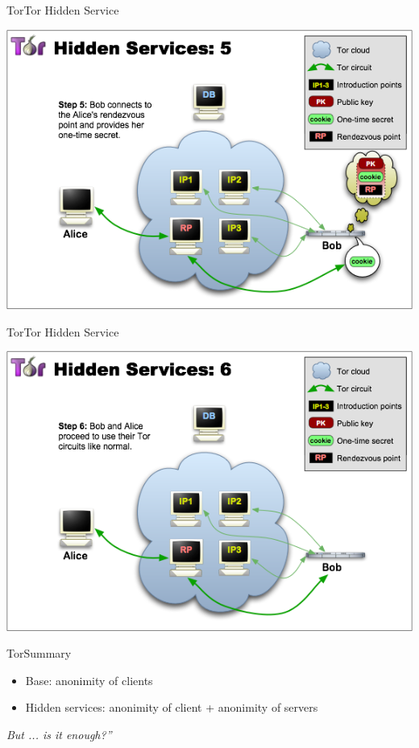 \begin{frame}{Tor}{Tor Hidden Service}
\begin{center}
	\includegraphics[scale=0.45]{imgs/THS-5.png}
\end{center}
\end{frame}

\begin{frame}{Tor}{Tor Hidden Service}
\begin{center}
	\includegraphics[scale=0.45]{imgs/THS-6.png}
\end{center}
\end{frame}

\begin{frame}{Tor}{Summary}
\begin{center}
	\begin{itemize}
		\item Base: anonimity of clients
		\item Hidden services: anonimity of client + anonimity of servers
	\end{itemize}
	
	\begin{center}
			\large{\emph{But ... is it enough?''}}
	\end{center}

\end{center}
\end{frame}
